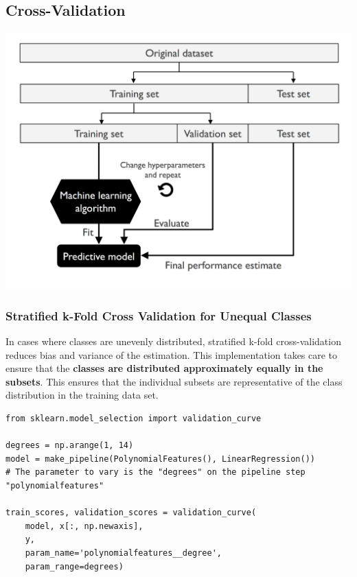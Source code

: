 \documentclass[11pt]{article}
\theoremstyle{definition}
\begin{document}
\subsection{Cross-Validation}
\begin{center}
	\includegraphics[width=0.7\linewidth]{img/cross_validation_hyperparameter_tuning}
\end{center}
\subsubsection{Stratified k-Fold Cross Validation for Unequal Classes}
In cases where classes are unevenly distributed, {\color{DodgerBlue3} stratified k-fold cross-validation} reduces bias and variance of the estimation. This implementation takes care to ensure that the \textbf{classes are distributed approximately equally in the subsets}. This ensures that the individual subsets are representative of the class distribution in the training data set.

\begin{verbatim}
from sklearn.model_selection import validation_curve

degrees = np.arange(1, 14)
model = make_pipeline(PolynomialFeatures(), LinearRegression())
# The parameter to vary is the "degrees" on the pipeline step "polynomialfeatures"

train_scores, validation_scores = validation_curve(
	model, x[:, np.newaxis],
	y,
	param_name='polynomialfeatures__degree',
	param_range=degrees)
\end{verbatim}
\end{document}
